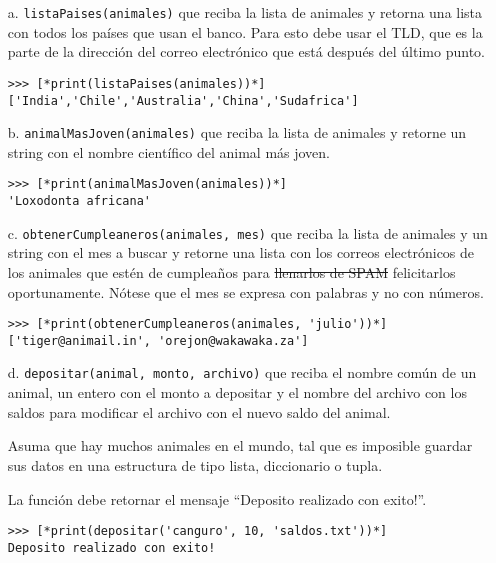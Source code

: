 \begin{itemize}
    \item[a.] \texttt{listaPaises(animales)} que reciba la lista de animales y retorna una lista con todos los países que usan el banco. Para esto debe usar el TLD, que es la parte de la dirección del correo electrónico que está después del último punto.

\begin{lstlisting}[style=consola]
>>> [*print(listaPaises(animales))*]
['India','Chile','Australia','China','Sudafrica']    \end{lstlisting}

    \item[b.] \texttt{animalMasJoven(animales)} que reciba la lista de animales y retorne un string con el nombre científico del animal más joven.

\begin{lstlisting}[style=consola]
>>> [*print(animalMasJoven(animales))*]
'Loxodonta africana'
\end{lstlisting}

    \item[c.] \texttt{obtenerCumpleaneros(animales, mes)} que reciba la lista de animales y un string con el mes a buscar y retorne una lista con los correos electrónicos de los animales que estén de cumpleaños para \sout{llenarlos de SPAM} felicitarlos oportunamente. Nótese que el mes se expresa con palabras y no con números.

\begin{lstlisting}[style=consola]
>>> [*print(obtenerCumpleaneros(animales, 'julio'))*]
['tiger@animail.in', 'orejon@wakawaka.za']
\end{lstlisting}

    \item[d.] \texttt{depositar(animal, monto, archivo)} que reciba el nombre común de un animal, un entero con el monto a depositar y el nombre del archivo con los saldos para modificar el archivo con el nuevo saldo del animal. 
    
    Asuma que hay muchos animales en el mundo, tal que es imposible guardar sus datos en una estructura de tipo lista, diccionario o tupla.
    
    La función debe retornar el mensaje ``Deposito realizado con exito!''.

\begin{lstlisting}[style=consola]
>>> [*print(depositar('canguro', 10, 'saldos.txt'))*]
Deposito realizado con exito!
\end{lstlisting}


\end{itemize}
